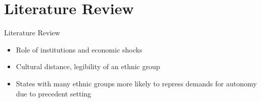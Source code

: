 \documentclass[11pt]{beamer}
\begin{document}

\section{Literature Review}
\begin{frame}{Literature Review}
        \begin{itemize}
        \item Role of institutions \citep{davenport_state_2007} and economic shocks \citep{blaydes_state_2018}
        \item Cultural distance, legibility of an ethnic group \citep{blaydes_state_2018}
        \item States with many ethnic groups more likely to repress demands for autonomy due to precedent setting \citep{evera_hypotheses_1994, toft_geography_2005, walter_reputation_2009}
        \end{itemize}

\end{frame}
\end{document}
